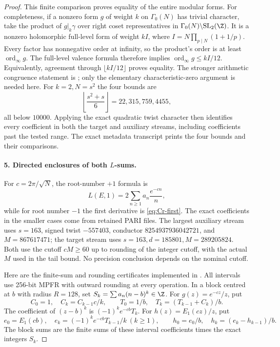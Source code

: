 \begin{proof}
This finite comparison proves equality of the entire modular forms.
For completeness, if a nonzero form $g$ of weight $k$ on
$\Gamma_0(N)$ has trivial character, take the product of
$g|_k\gamma$ over right coset representatives in
$\Gamma_0(N)\backslash\mathrm{SL}_2(\Z)$. It is a nonzero
holomorphic full-level form of weight $kI$, where
$I=N\prod_{p\mid N}(1+1/p)$. Every factor has nonnegative
order at infinity, so the product's order is at least
$\operatorname{ord}_\infty g$. The full-level valence formula
therefore implies $\operatorname{ord}_\infty g\leq kI/12$.
Equivalently, agreement through $\lfloor kI/12\rfloor$ proves
equality. The stronger arithmetic congruence statement is
\citet[Theorem 9.18]{CgzStein2007}; only the elementary
characteristic-zero argument is needed here. For $k=2,N=s^2$
the four bounds are
\[
 \left\lfloor\frac{s^2+s}{6}\right\rfloor
     =22,315,759,4455,
\]
all below $10000$. Applying the exact quadratic twist character
then identifies every coefficient in both the target and auxiliary
streams, including coefficients past the tested range. The exact
metadata transcript prints the four bounds and their comparisons.

\paragraph{5. Directed enclosures of both $L$-sums.}
For $c=2\pi/\sqrt N$, the root-number $+1$ formula is
\[
 L(E,1)=2\sum_{n\geq1}a_n\frac{e^{-cn}}n,
\]
while for root number $-1$ the first derivative is
\eqref{eq:Cr-first}. The exact coefficients in the smaller cases
come from retained PARI files. The largest auxiliary stream uses
$s=163$, signed twist $-557403$, conductor
$8254937936042721$, and $M=867617471$; the target stream uses
$s=163,d=185801,M=289205824$. Both use the cutoff $cM\geq60$
up to rounding of the integer cutoff, with the actual $M$ used in
the tail bound. No precision conclusion depends on the nominal
cutoff.

Here are the finite-sum and rounding certificates implemented in
. All intervals use 256-bit
MPFR with outward rounding at every operation. In a block centred
at $b$ with radius $R=128$, set
$S_k=\sum a_n(n-b)^k\in\Z$. For $g(z)=e^{-cz}/z$, put
\[
 C_0=1,\quad C_k=C_{k-1}c/k,\qquad
 T_0=1/b,\quad T_k=(T_{k-1}+C_k)/b.
\]
The coefficient of $(z-b)^k$ is $(-1)^ke^{-cb}T_k$.
For $h(z)=E_1(cz)/z$, put
\[
 e_0=E_1(cb),\quad e_k=(-1)^ke^{-cb}T_{k-1}/k\ (k\geq1),
 \qquad h_0=e_0/b,\quad h_k=(e_k-h_{k-1})/b.
\]
The block sums are the finite sums of these interval coefficients
times the exact integers $S_k$.


\end{proof}
